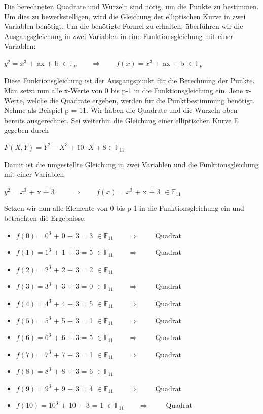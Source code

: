 Die berechneten Quadrate und Wurzeln sind nötig, um die Punkte zu bestimmen. Um dies zu bewerkstelligen, wird die Gleichung der elliptischen Kurve in zwei Variablen benötigt. Um die benötigte Formel zu erhalten, überführen wir die Ausgangsgleichung in zwei Variablen in eine Funktionsgleichung mit einer Variablen:
\begin{center}
$y^{2} =  x^{3}$ + ax + b  $\in \mathbb{F}_{p} \qquad \Longrightarrow \qquad f(x) =  x^{3}$ + ax + b  $\in \mathbb{F}_{p}$
\end{center}

Diese Funktionsgleichung ist der Ausgangspunkt für die Berechnung der Punkte. Man setzt nun alle x-Werte von 0 bis p-1 in die Funktionsgleichung ein. Jene x-Werte, welche die Quadrate ergeben, werden für die Punktbestimmung benötigt. Nehme als Beispiel p = 11. Wir haben die Quadrate und die Wurzeln oben bereits ausgerechnet. Sei weiterhin die Gleichung einer elliptischen Kurve E gegeben durch
\begin{center}
$F(X, Y) =  Y^{2} - X^{3} + 10 \cdot X + 8 \in \mathbb{F}_{11}$
\end{center}

Damit ist die umgestellte Gleichung in zwei Variablen und die Funktionsgleichung mit einer Variablen
\begin{center}
$y^{2} =  x^{3}$ + x + 3 $\qquad \Longrightarrow \qquad f(x) =  x^{3}$ + x + 3 $\in \mathbb{F}_{11}$
\end{center}
Setzen wir nun alle Elemente von 0 bis p-1 in die Funktionsgleichung ein und betrachten die Ergebnisse:

\begin{itemize}
\item $f(0) =  0^{3}$ + 0 + 3 = 3 $\in \mathbb{F}_{11} \qquad \Longrightarrow \qquad$ Quadrat
\item $f(1) =  1^{3}$ + 1 + 3 = 5 $\in \mathbb{F}_{11} \qquad \Longrightarrow \qquad$ Quadrat
\item $f(2) =  2^{3}$ + 2 + 3 = 2 $\in \mathbb{F}_{11}$
\item $f(3) =  3^{3}$ + 3 + 3 = 0 $\in \mathbb{F}_{11} \qquad \Longrightarrow \qquad$ Quadrat
\item $f(4) =  4^{3}$ + 4 + 3 = 5 $\in \mathbb{F}_{11} \qquad \Longrightarrow \qquad$ Quadrat
\item $f(5) =  5^{3}$ + 5 + 3 = 1 $\in \mathbb{F}_{11} \qquad \Longrightarrow \qquad$ Quadrat
\item $f(6) =  6^{3}$ + 6 + 3 = 5 $\in \mathbb{F}_{11} \qquad \Longrightarrow \qquad$ Quadrat
\item $f(7) =  7^{3}$ + 7 + 3 = 1 $\in \mathbb{F}_{11} \qquad \Longrightarrow \qquad$ Quadrat
\item $f(8) =  8^{3}$ + 8 + 3 = 6 $\in \mathbb{F}_{11}$
\item $f(9) =  9^{3}$ + 9 + 3 = 4 $\in \mathbb{F}_{11} \qquad \Longrightarrow \qquad$ Quadrat
\item $f(10) = 10^{3}$ + 10 + 3 = 1 $\in \mathbb{F}_{11} \qquad \Longrightarrow \qquad$ Quadrat
\end{itemize}

